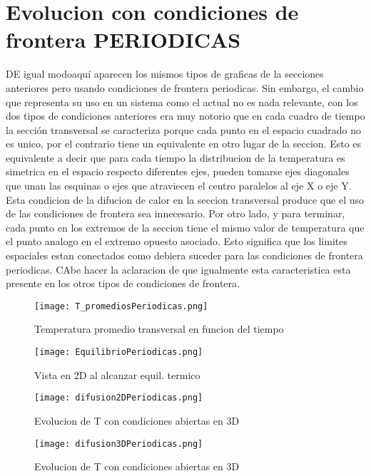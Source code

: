 \documentclass[13pts]{article}
\begin{document}
\section{Evolucion con condiciones de frontera PERIODICAS}
DE igual modoaquí aparecen los mismos tipos de graficas de la secciones anteriores pero usando condiciones de frontera periodicas. Sin embargo, el cambio que representa su uso en un sistema como el actual no es nada relevante, con los dos tipos de condiciones anteriores era muy notorio que en cada cuadro de tiempo la sección transversal se caracteriza porque cada punto en el espacio cuadrado no es unico, por el contrario tiene un equivalente en otro lugar de la seccion. Esto es equivalente a decir que para cada tiempo la distribucion de la temperatura es simetrica en el espacio respecto diferentes ejes, pueden tomarse ejes diagonales que unan las esquinas o ejes que atraviecen el centro paralelos al eje X o eje Y. Esta condicion de la difucion de calor en la seccion transversal produce que el uso de las condiciones de frontera sea innecesario. Por otro lado, y para terminar, cada punto en los extremos de la seccion tiene el mismo valor de temperatura que el punto analogo en el extremo opuesto asociado. Esto significa que los limites espaciales estan conectados como debiera suceder para las condiciones de frontera periodicas. CAbe hacer la aclaracion de que igualmente esta caracteristica esta presente en los otros tipos de condiciones de frontera.
\begin{figure}
	\centering
	\texttt{[image: T\_promediosPeriodicas.png]}
	\caption{Temperatura promedio transversal en funcion del tiempo}
	\label{promedioPeriodicas}
\end{figure}
\begin{figure}
	\centering
	\texttt{[image: EquilibrioPeriodicas.png]}
	\caption{Vista en 2D al alcanzar equil. termico}
	\label{equilPeriodicas}
\end{figure}
\begin{figure}
	\centering
	\texttt{[image: difusion2DPeriodicas.png]}
	\caption{Evolucion de T con condiciones abiertas en 3D}
	\label{2DPeriodicas}
\end{figure}
\begin{figure}
	\centering
	\texttt{[image: difusion3DPeriodicas.png]}
	\caption{Evolucion de T con condiciones abiertas en 3D}
	\label{3DPeriodicas}
\end{figure}
\end{document}
